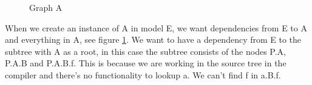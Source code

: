 \documentclass{cslthse-msc}
\begin{document}
\begin{figure}[H]
    \centering
    \qquad
    \subfloat{\raisebox{4.7 cm}{}}
    \caption{Graph A}
    \label{fig:graphA}
\end{figure}

When we create an instance of A in model E, we want dependencies from E to A and everything in A, see figure \ref{fig:graphA}. We want to have a dependency from E to the subtree with A as a root, in this case the subtree consists of the nodes P.A, P.A.B and P.A.B.f. This is because we are working in the source tree in the compiler and there's no functionality to lookup a. We can't find f in a.B.f.
\end{document}
